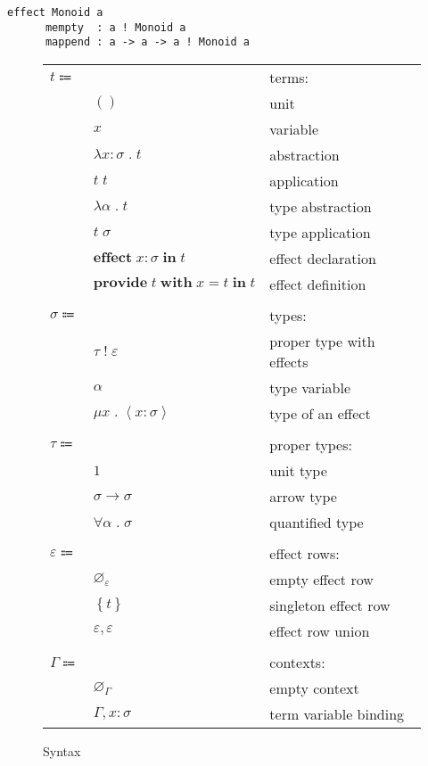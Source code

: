 \documentclass[12pt]{article}
\newcommand\anno[2]{#1 : #2}
\newcommand\term{t}
\newcommand\eunit{()}
\newcommand\evar{x}
\newcommand\eabs[2]{\lambda #1 \; . \; #2}
\newcommand\eapp[2]{#1 \; #2}
\newcommand\etabs[2]{\lambda #1 \; . \; #2}
\newcommand\etapp[2]{#1 \; #2}
\newcommand\eeffect[3]{\textbf{effect} \; \anno{#1}{#2} \; \textbf{in} \; #3}
\newcommand\eprovide[4]{\textbf{provide} \; #1 \; \textbf{with} \; #2 = #3 \; \textbf{in} \; #4}
\newcommand\type{\sigma}
\newcommand\tptwithr[2]{#1 \; ! \; #2}
\newcommand\tvar{\alpha}
\newcommand\teffect[3]{\mu #1 \; . \; \left\langle\anno{#2}{#3}\right\rangle}
\newcommand\properType{\tau}
\newcommand\ptunit{1}
\newcommand\ptarrow[2]{#1 \rightarrow #2}
\newcommand\ptforall[2]{\forall #1 \; . \; #2}
\newcommand\row{\varepsilon}
\newcommand\rempty{\varnothing_{\row}}
\newcommand\rsingleton[1]{\left\{ #1 \right\}}
\newcommand\runion[2]{#1, #2}
\newcommand\context{\Gamma}
\newcommand\cempty{\varnothing_{\context}}
\newcommand\ceextend[2]{#1, #2}
\begin{document}
  \begin{lstlisting}[gobble=4]
    effect Monoid a
      mempty  : a ! Monoid a
      mappend : a -> a -> a ! Monoid a
  \end{lstlisting}

  \begin{figure}
    \begin{mdframed}[backgroundcolor=none]
      \begin{center}
        \begin{tabular}{l l l}
          $\term \Coloneqq $ & & terms: \\
          & $\eunit$ & unit \\
          & $\evar$ & variable \\
          & $\eabs{\anno{\evar}{\type}}{\term}$ & abstraction \\
          & $\eapp{\term}{\term}$ & application \\
          & $\etabs{\tvar}{\term}$ & type abstraction \\
          & $\etapp{\term}{\type}$ & type application \\
          & $\eeffect{\evar}{\type}{\term}$ & effect declaration \\
          & $\eprovide{\term}{\evar}{\term}{\term}$ & effect definition \\
          \\
          $\type \Coloneqq$ & & types: \\
          & $\tptwithr{\properType}{\row}$ & proper type with effects \\
          & $\tvar$ & type variable \\
          & $\teffect{\evar}{\evar}{\type}$ & type of an effect \\
          \\
          $\properType \Coloneqq$ & & proper types: \\
          & $\ptunit$ & unit type \\
          & $\ptarrow{\type}{\type}$ & arrow type \\
          & $\ptforall{\tvar}{\type}$ & quantified type \\
          \\
          $\row \Coloneqq$ & & effect rows: \\
          & $\rempty$ & empty effect row \\
          & $\rsingleton{\term}$ & singleton effect row \\
          & $\runion{\row}{\row}$ & effect row union \\
          \\
          $\context \Coloneqq$ & & contexts: \\
          & $\cempty$ & empty context \\
          & $\ceextend{\context}{\anno{\evar}{\type}}$ & term variable binding \\
        \end{tabular}
      \end{center}

      \caption{Syntax}\label{fig:syntax}
    \end{mdframed}
  \end{figure}
\end{document}
